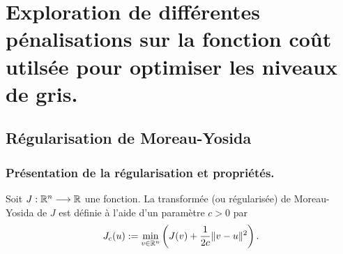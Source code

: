 \documentclass[main.tex]{subfiles}
\begin{document}
\chapter{Exploration de différentes pénalisations sur la fonction coût utilsée pour optimiser les niveaux de gris. }

\section{Régularisation de Moreau-Yosida}
\subsection{Présentation de la régularisation et propriétés.}
\begin{dfn}\label{dfn:moreau_yosida}
Soit $J : \mathbb{R}^n \longrightarrow \mathbb{R}$ une fonction. La transformée (ou régularisée) de Moreau-Yosida de $J$ est définie à l'aide d'un paramètre $c>0$ par
\begin{equation}
J_c(u) := \min_{v\in \mathbb{R}^n} \left( J(v) + \frac{1}{2c} \|v-u\|^2 \right).
\end{equation}
\end{dfn}
\end{document}
